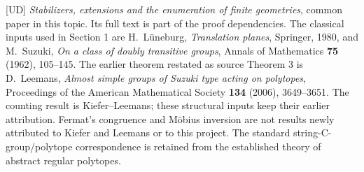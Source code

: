 [UD] \emph{Stabilizers, extensions and the enumeration of finite geometries},
common paper in this topic. Its full text is part of the proof dependencies.
The classical inputs used in Section 1 are H.~Lüneburg,
\emph{Translation planes}, Springer, 1980, and M.~Suzuki,
\emph{On a class of doubly transitive groups}, Annals of Mathematics
\textbf{75} (1962), 105--145. The earlier theorem restated as source
Theorem 3 is D.~Leemans, \emph{Almost simple groups of Suzuki type acting
on polytopes}, Proceedings of the American Mathematical Society
\textbf{134} (2006), 3649--3651. The counting result is Kiefer--Leemans;
these structural inputs keep their earlier attribution. Fermat's congruence and M\"obius
inversion are not results newly attributed to Kiefer and Leemans or to this
project. The standard string-C-group/polytope correspondence is retained
from the established theory of abstract regular polytopes.

